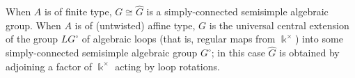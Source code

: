 \documentclass[12pt]{amsart}
\newcommand{\kk}{\Bbbk}%
\newcommand\onto{\twoheadrightarrow}
\newcommand\into{\hookrightarrow}
\DeclareMathOperator{\Hom}{Hom}
\theoremstyle{remark}
\numberwithin{equation}{section}
\begin{document}
When $A$ is of finite type, $G \cong \widehat{G}$ is a simply-connected semisimple algebraic group. When $A$ is of (untwisted) affine type, $G$ is the universal central extension of the group $LG^\circ$ of algebraic loops (that is, regular maps from $\kk^\times$) into some simply-connected semisimple algebraic group $G^\circ$; in this case $\widehat{G}$ is obtained by adjoining a factor of $\kk^\times$ acting by loop rotations.




\end{document}
